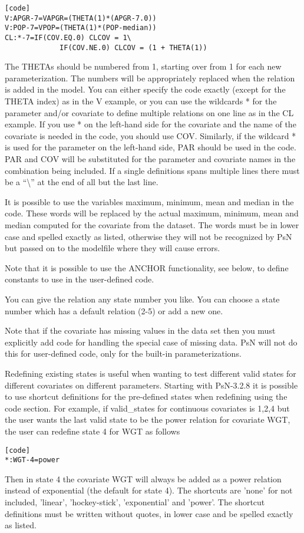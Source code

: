 \begin{verbatim}
[code]
V:APGR-7=VAPGR=(THETA(1)*(APGR-7.0))
V:POP-7=VPOP=(THETA(1)*(POP-median))
CL:*-7=IF(COV.EQ.0) CLCOV = 1\ 
             IF(COV.NE.0) CLCOV = (1 + THETA(1))
\end{verbatim}

The THETAs should be numbered from 1, starting over from 1 for each new parameterization. The numbers will be appropriately replaced when the relation is added in the model. You can either specify the code exactly (except for the THETA index) as in the V example, or you can use the wildcards * for the parameter and/or covariate to define multiple relations on one line as in the CL example.  If you use * on the left-hand side for the covariate and the name of the covariate is needed in the code, you should use COV. Similarly, if the wildcard * is used for the parameter on the left-hand side, PAR should be used in the code. PAR and COV will be substituted for the parameter and covariate names in the combination being included. If a single definitions spans multiple lines there must be a  “\textbackslash” at the end of all but the last line.

It is possible to use the variables maximum, minimum, mean and median in the code. These words will be replaced by the actual maximum, minimum, mean and median computed for the covariate from the dataset. The words must be in lower case and spelled exactly as listed, otherwise they will not be recognized by PsN but passed on to the modelfile where they will cause errors. 

Note that it is possible to use the ANCHOR functionality, see below, to define constants to use in the user-defined code.

You can give the relation any state number you like. You can choose a state number which has a default relation (2-5) or add a new one. 

Note that if the covariate has missing values in the data set then you must explicitly add code for handling the special case of missing data. PsN will not do this for user-defined code, only for the built-in parameterizations.

Redefining existing states is useful when wanting to test different valid states for different covariates on different parameters. Starting with PsN-3.2.8 it is possible to use shortcut definitions for the pre-defined states when redefining using the code section. For example, if valid\_states for continuous covariates is 1,2,4 but the user wants the last valid state to be the power relation for covariate WGT, the user can redefine state 4 for WGT as follows
\begin{verbatim}
[code]
*:WGT-4=power
\end{verbatim}
Then in state 4 the covariate WGT will always be added as a power relation instead of exponential (the default for state 4). The shortcuts are 'none' for not included, 'linear', 'hockey-stick', 'exponential' and 'power'. The shortcut definitions must be written without quotes, in lower case and be spelled exactly as listed. 

